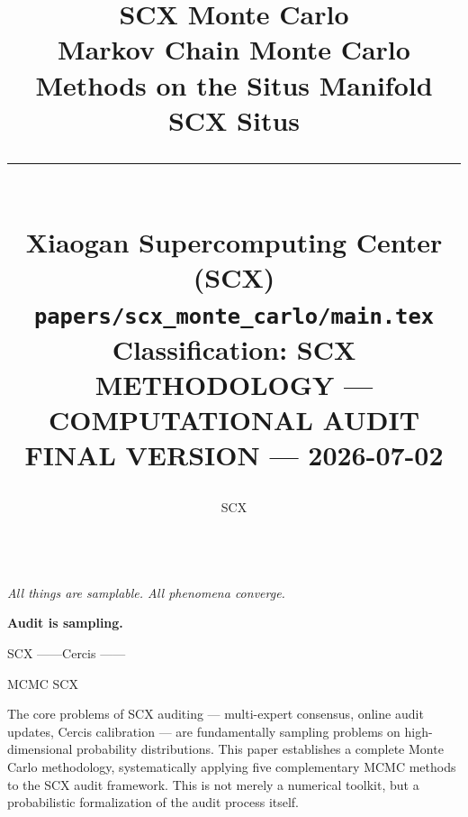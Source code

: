 \documentclass[12pt,a4paper]{article}
\title{
    \vspace{1.0cm}
    {\Huge \textbf{SCX Monte Carlo}}\\[0.3cm]
    {\LARGE Markov Chain Monte Carlo Methods on the Situs Manifold}\\[0.3cm]
    {\Large \textcolor{scxblue}{SCX Situs }}\\[0.8cm]
    \rule{\textwidth}{1.5pt}\\[0.5cm]
    {\normalsize Xiaogan Supercomputing Center (SCX)}\\[0.2cm]
    {\small \texttt{papers/scx\_monte\_carlo/main.tex}}\\[0.2cm]
    {\small Classification: SCX METHODOLOGY — COMPUTATIONAL AUDIT}\\[0.2cm]
    {\small FINAL VERSION — 2026-07-02}
    \vspace{0.5cm}
}
\author{SCX}
\date{}
\theoremstyle{plain}
\theoremstyle{definition}
\newcommand{\Situs}{\mathfrak{S}}
\newcommand{\Cercis}{\mathfrak{C}}
\DeclareMathOperator{\Rhat}{\hat{R}}
\DeclareMathOperator{\Vol}{Vol}
\begin{document}
\maketitle
\thispagestyle{empty}

\begin{center}

\vspace{0.5cm}
{\large \textcolor{scxblue}{ }}\\[0.2cm]
{\normalsize \textit{All things are samplable. All phenomena converge.}}
\end{center}

\vspace{0.5cm}

\begin{scxbox}
\textbf{Audit is sampling.}

SCX ——Cercis ——

 MCMC  SCX 


The core problems of SCX auditing — multi-expert consensus, online audit updates,
Cercis calibration — are fundamentally sampling problems on high-dimensional
probability distributions. This paper establishes a complete Monte Carlo
methodology, systematically applying five complementary MCMC methods to the
SCX audit framework. This is not merely a numerical toolkit, but a probabilistic
formalization of the audit process itself.
\end{scxbox}
\end{document}
